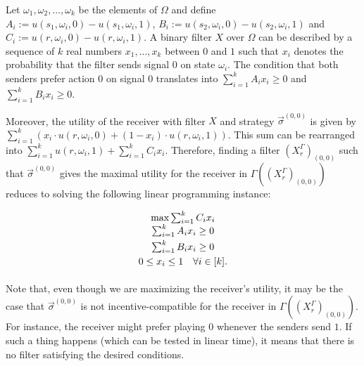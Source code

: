 \documentclass[submission,copyright,creativecommons]{eptcs}
\newcommand{\commentout}[1]{}
\begin{document}
\commentout{Our aim then is finding a binary filter $X$ such that both senders and the receiver prefer action $0$ on signal $0$, the receiver prefers action $1$ on signal $1$, and such that the receiver gets the maximal possible utility by playing $0$ on signal $0$ and $1$ on signal $1$.}
Let $\omega_1, \omega_2, \ldots, \omega_k$ be the elements of $\Omega$ and define $A_i := u(s_1, \omega_i, 0) - u(s_1, \omega_i, 1)$, $B_i := u(s_2, \omega_i, 0) - u(s_2, \omega_i, 1)$ and $C_i := u(r, \omega_i, 0) - u(r, \omega_i, 1)$. A binary filter $X$ over $\Omega$ can be described by a sequence of $k$ real numbers $x_1, \ldots, x_k$ between $0$ and $1$ such that $x_i$ denotes the probability that the filter sends signal $0$ on state $\omega_i$. The condition that both senders prefer action $0$ on signal $0$ translates into $\sum_{i = 1}^k A_i x_i \ge 0$ and $\sum_{i = 1}^k B_i x_i \ge 0$.
\commentout{
$$\begin{array}{c}
    \sum_{i = 1}^k A_i x_i \ge 0\\
    \sum_{i = 1}^k B_i x_i \ge 0.\\ 
    \end{array}$$
}

Moreover, the utility of the receiver with filter $X$ and strategy $\vec{\sigma}^{(0,0)}$ is given by $\sum_{i = 1}^k (x_i \cdot u(r, \omega_i, 0) + (1 - x_i) \cdot u(r, \omega_i, 1))$. This sum can be rearranged into $\sum_{i = 1}^k u(r, \omega_i, 1) + \sum_{i = 1}^k C_i x_i$. Therefore, finding a filter $(X_r^\Gamma)_{(0,0)}$ such that $\vec{\sigma}^{(0,0)}$ gives the maximal utility for the receiver in $\Gamma((X_r^\Gamma)_{(0,0)})$ reduces to solving the following linear programming instance:

$$ \begin{array}{c}
\max \sum_{i = 1}^k C_i x_i\\
\vspace{1mm}
\sum_{i = 1}^k A_i x_i \ge 0\\
\vspace{1mm}
\sum_{i = 1}^k B_i x_i \ge 0\\
\vspace{1mm}
0 \le x_i \le 1 \quad \forall i \in [k].
\end{array} $$

Note that, even though we are maximizing the receiver's utility, it may be the case that $\vec{\sigma}^{(0,0)}$ is not incentive-compatible for the receiver in $\Gamma((X_r^\Gamma)_{(0,0)})$. For instance, the receiver might prefer playing $0$ whenever the senders send $1$. If such a thing happens (which can be tested in linear time), it means  that there is no filter satisfying the desired conditions.
\end{document}
